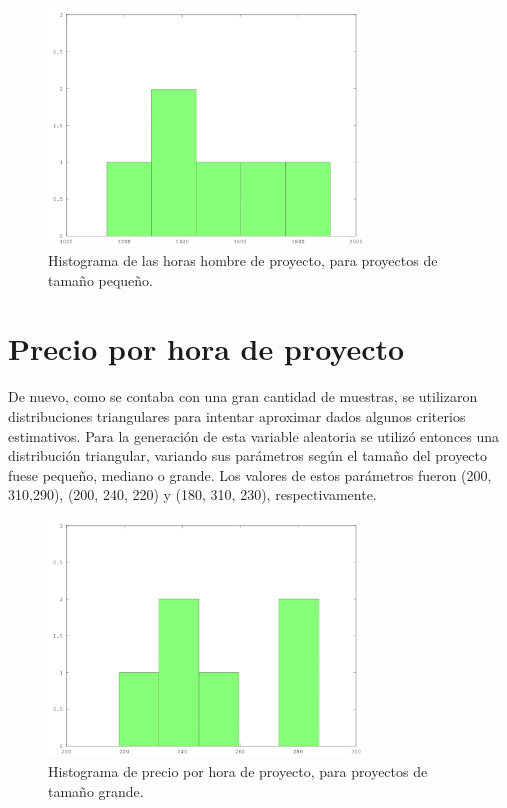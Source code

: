 \begin{figure}[H]
\begin{center}
 \includegraphics[width=0.75\textwidth,height=0.75\textheight,keepaspectratio]{./images/data-small-hours.png}
\end{center}

\caption{Histograma de las horas hombre de proyecto, para proyectos de tamaño pequeño.}
\end{figure}

\section*{Precio por hora de proyecto}
De nuevo, como se contaba con una gran cantidad de muestras, se utilizaron distribuciones triangulares para intentar aproximar dados algunos criterios estimativos. Para la generación 
de esta variable aleatoria se utilizó entonces una distribución triangular, variando sus parámetros según el tamaño del proyecto fuese pequeño, mediano o grande. Los valores de estos
parámetros fueron (200, 310,290), (200, 240, 220) y (180, 310, 230), respectivamente.

\begin{figure}[H]
\begin{center}
 \includegraphics[width=0.75\textwidth,height=0.75\textheight,keepaspectratio]{./images/data-big-money.png}
\end{center}
\caption{Histograma de precio por hora de proyecto, para proyectos de tamaño grande.}
\end{figure}


